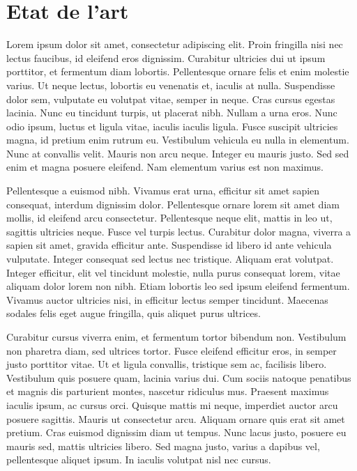 
\chapter{Etat de l'art}

\cite{weill-duflos_optimizing_2015}

Lorem ipsum dolor sit amet, consectetur adipiscing elit. Proin fringilla
nisi nec lectus faucibus, id eleifend eros dignissim. Curabitur ultricies
dui ut ipsum porttitor, et fermentum diam lobortis. Pellentesque ornare
felis et enim molestie varius. Ut neque lectus, lobortis eu venenatis
et, iaculis at nulla. Suspendisse dolor sem, vulputate eu volutpat
vitae, semper in neque. Cras cursus egestas lacinia. Nunc eu tincidunt
turpis, ut placerat nibh. Nullam a urna eros. Nunc odio ipsum, luctus
et ligula vitae, iaculis iaculis ligula. Fusce suscipit ultricies
magna, id pretium enim rutrum eu. Vestibulum vehicula eu nulla in
elementum. Nunc at convallis velit. Mauris non arcu neque. Integer
eu mauris justo. Sed sed enim et magna posuere eleifend. Nam elementum
varius est non maximus.

Pellentesque a euismod nibh. Vivamus erat urna, efficitur sit amet
sapien consequat, interdum dignissim dolor. Pellentesque ornare lorem
sit amet diam mollis, id eleifend arcu consectetur. Pellentesque neque
elit, mattis in leo ut, sagittis ultricies neque. Fusce vel turpis
lectus. Curabitur dolor magna, viverra a sapien sit amet, gravida
efficitur ante. Suspendisse id libero id ante vehicula vulputate.
Integer consequat sed lectus nec tristique. Aliquam erat volutpat.
Integer efficitur, elit vel tincidunt molestie, nulla purus consequat
lorem, vitae aliquam dolor lorem non nibh. Etiam lobortis leo sed
ipsum eleifend fermentum. Vivamus auctor ultricies nisi, in efficitur
lectus semper tincidunt. Maecenas sodales felis eget augue fringilla,
quis aliquet purus ultrices.

Curabitur cursus viverra enim, et fermentum tortor bibendum non. Vestibulum
non pharetra diam, sed ultrices tortor. Fusce eleifend efficitur eros,
in semper justo porttitor vitae. Ut et ligula convallis, tristique
sem ac, facilisis libero. Vestibulum quis posuere quam, lacinia varius
dui. Cum sociis natoque penatibus et magnis dis parturient montes,
nascetur ridiculus mus. Praesent maximus iaculis ipsum, ac cursus
orci. Quisque mattis mi neque, imperdiet auctor arcu posuere sagittis.
Mauris ut consectetur arcu. Aliquam ornare quis erat sit amet pretium.
Cras euismod dignissim diam ut tempus. Nunc lacus justo, posuere eu
mauris sed, mattis ultricies libero. Sed magna justo, varius a dapibus
vel, pellentesque aliquet ipsum. In iaculis volutpat nisl nec cursus.

